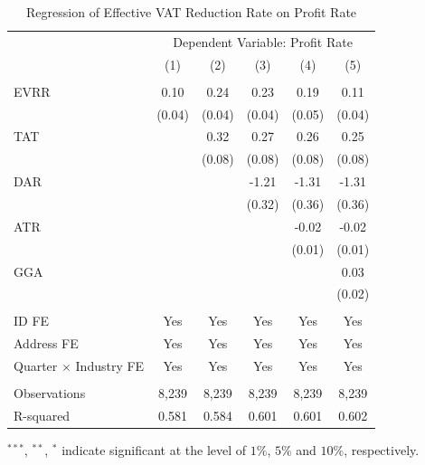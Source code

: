 \documentclass[3p,times]{elsarticle}
\begin{document}
\begin{table}[htp!]
    \centering
    \caption{Regression of Effective VAT Reduction Rate on Profit Rate}
    \begin{threeparttable}
    \begin{tabular}{l|ccccc}%
        \toprule\toprule
        &\multicolumn{5}{c}{Dependent Variable: Profit Rate}\\
        \cline{2-6}
         & (1) & (2) & (3) & (4) & (5) \\
         \hline
         &  &  &  &  &  \\
        EVRR&0.10\tnote{**}&	0.24\tnote{***}	&0.23\tnote{***}&	0.19\tnote{***}	&0.11\tnote{***}\\&
        (0.04)&	(0.04)&	(0.04)	&(0.05)&	(0.04)\\
        TAT&&0.32\tnote{***}&	0.27\tnote{***}	&0.26\tnote{***}&	0.25\tnote{***}\\&&
        (0.08)&	(0.08)	&(0.08)	&(0.08)\\
        DAR&&&-1.21\tnote{***}&	-1.31\tnote{***}&	-1.31\tnote{***}\\&&&
        (0.32)&	(0.36)&	(0.36)\\
        ATR&&&&-0.02\tnote{*}&	-0.02\tnote{*}\\
        &&&&(0.01)&	(0.01)\\
        GGA&&&&&0.03\\
        &&&&&(0.02)
        \\
          &  &  &  &  &  \\
        ID FE & Yes & Yes& Yes& Yes& Yes  \\
        Address FE & Yes & Yes& Yes& Yes& Yes \\
        Quarter $\times$ Industry FE & Yes & Yes& Yes& Yes& Yes  \\
         &  &  &  &  &  \\
        
        Observations  & 8,239 & 	8,239	 & 8,239 & 	8,239 & 	8,239 \\
        R-squared & 0.581&	0.584&	0.601&	0.601	&0.602 \\
        \bottomrule
    \end{tabular}
    \begin{tablenotes}
        \item $^{***}$, $^{**}$, $^{*}$ indicate significant at the level of $1\%$, $5\%$ and $10\%$, respectively.
    \end{tablenotes}
    \end{threeparttable}
    \label{tab:esti_prof}
\end{table}
\end{document}
